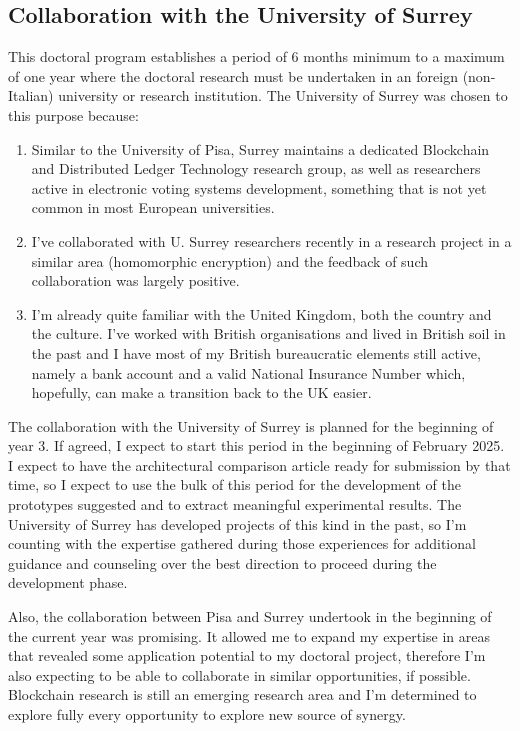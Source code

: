\documentclass[../main.tex]{subfiles}
\begin{document}
\subsection{Collaboration with the University of Surrey}
This doctoral program establishes a period of 6 months minimum to a maximum of one year where the doctoral research must be undertaken in an foreign (non-Italian) university or research institution. The University of Surrey was chosen to this purpose because:
\begin{enumerate}
    \item {Similar to the University of Pisa, Surrey maintains a dedicated Blockchain and Distributed Ledger Technology research group, as well as researchers active in electronic voting systems development, something that is not yet common in most European universities.}
    \item {I've collaborated with U. Surrey researchers recently in a research project in a similar area (homomorphic encryption) and the feedback of such collaboration was largely positive.}
    \item {I'm already quite familiar with the United Kingdom, both the country and the culture. I've worked with British organisations and lived in British soil in the past and I have most of my British bureaucratic elements still active, namely a bank account and a valid National Insurance Number which, hopefully, can make a transition back to the UK easier.}
\end{enumerate}

The collaboration with the University of Surrey is planned for the beginning of year 3. If agreed, I expect to start this period in the beginning of February 2025. I expect to have the architectural comparison article ready for submission by that time, so I expect to use the bulk of this period for the development of the prototypes suggested and to extract meaningful experimental results. The University of Surrey has developed projects of this kind in the past, so I'm counting with the expertise gathered during those experiences for additional guidance and counseling over the best direction to proceed during the development phase.
\par
Also, the collaboration between Pisa and Surrey undertook in the beginning of the current year was promising. It allowed me to expand my expertise in areas that revealed some application potential to my doctoral project, therefore I'm also expecting to be able to collaborate in similar opportunities, if possible. Blockchain research is still an emerging research area and I'm determined to explore fully every opportunity to explore new source of synergy.
\end{document}
